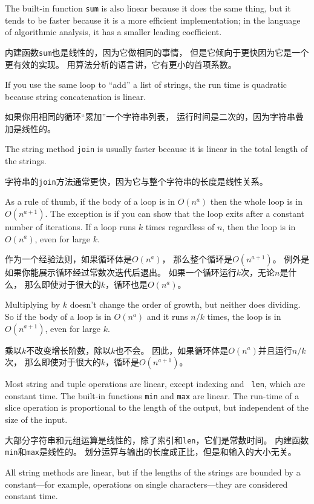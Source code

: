 \documentclass[10pt]{book}
\begin{document}
\begin{CJK}{UTF8}{gbsn}
The built-in function {\tt sum} is also linear because it does
the same thing, but it tends to be faster because it is a more
efficient implementation; in the language of algorithmic analysis,
it has a smaller leading coefficient.

内建函数{\tt sum}也是线性的，因为它做相同的事情，
但是它倾向于更快因为它是一个更有效的实现。
用算法分析的语言讲，它有更小的首项系数。

If you use the same loop to ``add'' a list of strings, the
run time is quadratic
because string concatenation is linear.

如果你用相同的循环``累加''一个字符串列表，
运行时间是二次的，因为字符串叠加是线性的。

The string method {\tt join} is usually faster because it is
linear in the total length of the strings.

字符串的{\tt join}方法通常更快，因为它与整个字符串的长度是线性关系。

As a rule of thumb, if the body of a loop is in $O(n^a)$ then
the whole loop is in $O(n^{a+1})$.  The exception is if you can
show that the loop exits after a constant number of iterations.
If a loop runs $k$ times regardless of $n$, then
the loop is in $O(n^a)$, even for large $k$.

作为一个经验法则，如果循环体是$O(n^a)$，
那么整个循环是$O(n^{a+1})$。
例外是如果你能展示循环经过常数次迭代后退出。
如果一个循环运行$k$次，无论$n$是什么，
那么即使对于很大的$k$，循环也是$O(n^a)$。

Multiplying by $k$ doesn't change the order of growth, but neither
does dividing.  So if the body of a loop is in $O(n^a)$ and it runs
$n/k$ times, the loop is in $O(n^{a+1})$, even for large $k$.

乘以$k$不改变增长阶数，除以$k$也不会。
因此，如果循环体是$O(n^a)$并且运行$n/k$次，
那么即使对于很大的$k$，循环是$O(n^{a+1})$。

Most string and tuple operations are linear, except indexing and {\tt
  len}, which are constant time.  The built-in functions {\tt min} and
{\tt max} are linear.  The run-time of a slice operation is
proportional to the length of the output, but independent of the size
of the input.

大部分字符串和元组运算是线性的，除了索引和{\tt len}，它们是常数时间。
内建函数{\tt min}和{\tt max}是线性的。
划分运算与输出的长度成正比，但是和输入的大小无关。

All string methods are linear, but if the lengths of
the strings are bounded by a constant---for example, operations on single
characters---they are considered constant time.


\end{CJK}
\end{document}
